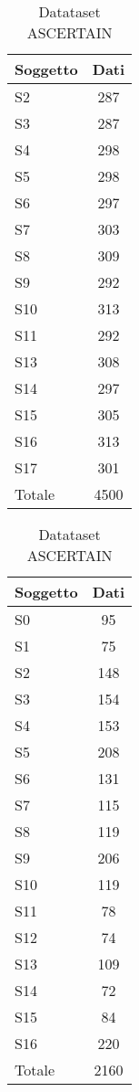 \begin{table}[h]
	
\end{table}
\begin{table}[h]
    \parbox{.45\linewidth}{
    	\begin{center}
    		\begin{tabular}{l|c}
    		     \textbf{Soggetto} & \textbf{Dati}\\
    		     \hline
    		     S2 & 287 \\
    		     S3 & 287 \\
    		     S4 & 298 \\
    		     S5 & 298 \\
    		     S6 & 297 \\
    		     S7 & 303 \\
    		     S8 & 309 \\
    		     S9 & 292 \\
    		     S10 & 313 \\
    		     S11 & 292 \\
    		     S13 & 308 \\
    		     S14 & 297 \\
    		     S15 & 305 \\
    		     S16 & 313 \\
    		     S17 & 301 \\
    		     \hline
    		     Totale & 4500
    		\end{tabular}
    		\caption{Datataset WESAD}
    		\label{tab:splittedwesad}
    	\end{center}
	}
    \parbox{.45\linewidth}{
    	\begin{center}
    		\begin{tabular}{l|c}
    		     \textbf{Soggetto} & \textbf{Dati}\\
    		     \hline
    		     S0 & 95 \\
    		     S1 & 75 \\
    		     S2 & 148 \\
    		     S3 & 154 \\
    		     S4 & 153 \\
    		     S5 & 208 \\
    		     S6 & 131 \\
    		     S7 & 115 \\
    		     S8 & 119 \\
    		     S9 & 206 \\
    		     S10 & 119 \\
    		     S11 & 78 \\
    		     S12 & 74 \\
    		     S13 & 109 \\
    		     S14 & 72 \\
    		     S15 & 84 \\
    		     S16 & 220 \\
    		     \hline
    		     Totale & 2160
    		\end{tabular}
    		\caption{Datataset ASCERTAIN}
    		\label{tab:splittedascertain}
    	\end{center}
    }
\end{table}
